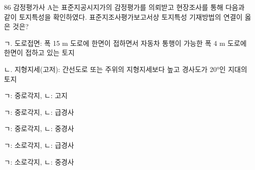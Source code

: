 \begin{question}{86}
감정평가사 A는 표준지공시지가의 감정평가를 의뢰받고 현장조사를 통해 다음과 같이 토지특성을 확인하였다. 표준지조사평가보고서상 토지특성 기재방법의 연결이 옳은 것은?
\begin{framedtext}
ㄱ. 도로접면: 폭 15 m 도로에 한면이 접하면서 자동차 통행이 가능한 폭 4 m 도로에 한면이 접하고 있는 토지 \par
ㄴ. 지형지세(고저): 간선도로 또는 주위의 지형지세보다 높고 경사도가 20°인 지대의 토지 \par
\end{framedtext}
\begin{choices}
  \item ㄱ: 중로각지, ㄴ: 고지
  \item ㄱ: 중로각지, ㄴ: 급경사
  \item ㄱ: 중로각지, ㄴ: 중경사
  \item ㄱ: 소로각지, ㄴ: 급경사
  \item ㄱ: 소로각지, ㄴ: 중경사
\end{choices}
\end{question}
